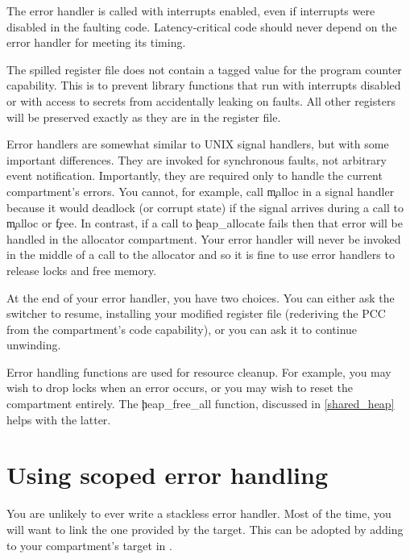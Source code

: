 
\begin{warning}
The error handler is called with interrupts enabled, even if interrupts were disabled in the faulting code.
Latency-critical code should never depend on the error handler for meeting its timing.
\end{warning}

The spilled register file does not contain a tagged value for the program counter capability.
This is to prevent library functions that run with interrupts disabled or with access to secrets from accidentally leaking on faults.
All other registers will be preserved exactly as they are in the register file.

\begin{note}
Error handlers are somewhat similar to UNIX signal handlers, but with some important differences.
They are invoked for synchronous faults, not arbitrary event notification.
Importantly, they are required only to handle the current compartment's errors.
You cannot, for example, call \c{malloc} in a signal handler because it would deadlock (or corrupt state) if the signal arrives during a call to \c{malloc} or \c{free}.
In contrast, if a call to \c{heap_allocate} fails then that error will be handled in the allocator compartment.
Your error handler will never be invoked in the middle of a call to the allocator and so it is fine to use error handlers to release locks and free memory.
\end{note}

At the end of your error handler, you have two choices.
You can either ask the switcher to resume, installing your modified register file (rederiving the PCC from the compartment's code capability), or you can ask it to continue unwinding.

Error handling functions are used for resource cleanup.
For example, you may wish to drop locks when an error occurs, or you may wish to reset the compartment entirely.
The \c{heap_free_all} function, discussed in \ref{shared_heap} helps with the latter.

\section{Using scoped error handling}

You are unlikely to ever write a stackless error handler.
Most of the time, you will want to link the one provided by the  target.
This can be adopted by adding  to your compartment's target in .

